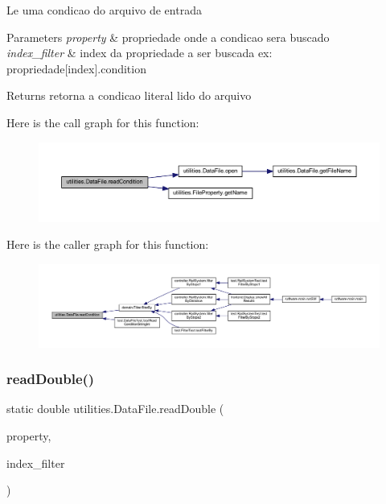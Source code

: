 Le uma condicao do arquivo de entrada 
\begin{DoxyParams}{Parameters}
{\em property} & propriedade onde a condicao sera buscado \\
\hline
{\em index\+\_\+filter} & index da propriedade a ser buscada ex\+: propriedade\mbox{[}index\mbox{]}.condition \\
\hline
\end{DoxyParams}
\begin{DoxyReturn}{Returns}
retorna a condicao literal lido do arquivo 
\end{DoxyReturn}
Here is the call graph for this function\+:\nopagebreak
\begin{figure}[H]
\begin{center}
\leavevmode
\includegraphics[width=350pt]{classutilities_1_1_data_file_ae44a128705ef07c67393153806fb5216_cgraph}
\end{center}
\end{figure}
Here is the caller graph for this function\+:\nopagebreak
\begin{figure}[H]
\begin{center}
\leavevmode
\includegraphics[width=350pt]{classutilities_1_1_data_file_ae44a128705ef07c67393153806fb5216_icgraph}
\end{center}
\end{figure}
\mbox{\label{classutilities_1_1_data_file_aafa9fbee5003c8d9abcd0b02ba4b31dc}} 
\subsubsection{\texorpdfstring{read\+Double()}{readDouble()}}
{\footnotesize\ttfamily static double utilities.\+Data\+File.\+read\+Double (\begin{DoxyParamCaption}\item[{\hyperlink{enumutilities_1_1_file_property}{File\+Property}}]{property,  }\item[{int}]{index\+\_\+filter }\end{DoxyParamCaption})\hspace{0.3cm}{\ttfamily [static]}}

